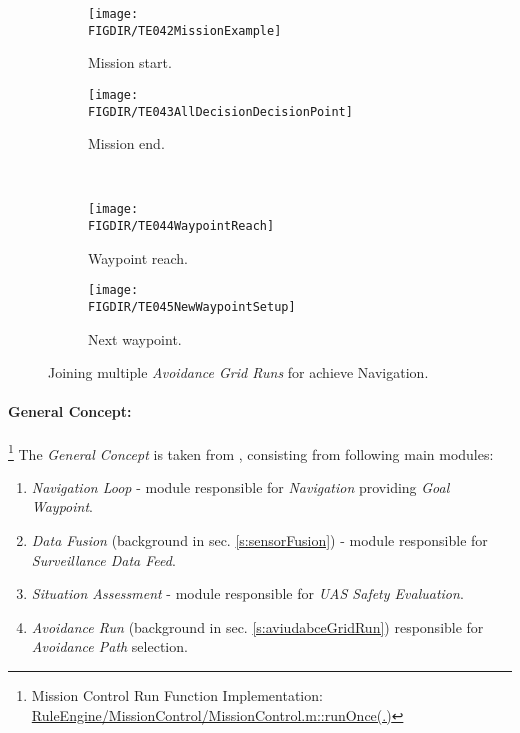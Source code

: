 \begin{figure}[H]
    \centering
    \begin{subfigure}{0.48\textwidth}
        \centering
        \texttt{[image: \\FIGDIR/TE042MissionExample]}
        \caption{Mission start.}
        \label{fig:missionExampleWithOAGR}
    \end{subfigure}
    \begin{subfigure}{0.48\textwidth}
    	\centering
        \texttt{[image: \\FIGDIR/TE043AllDecisionDecisionPoint]} 
        \caption{Mission end.}
        \label{fig:finishedMissionAGR}
    \end{subfigure}
    \\
    \centering
    \begin{subfigure}{0.48\textwidth}
        \centering
        \texttt{[image: \\FIGDIR/TE044WaypointReach]}
        \caption{Waypoint reach.}
        \label{fig:waypointReachAGR}
    \end{subfigure}
    \begin{subfigure}{0.48\textwidth}
    	\centering
        \texttt{[image: \\FIGDIR/TE045NewWaypointSetup]} 
        \caption{Next waypoint.}
        \label{fig:newtWaypointAGR}
    \end{subfigure}
    \caption{Joining multiple \emph{Avoidance Grid Runs} for achieve Navigation.}
    \label{fig:joiningMultipleAGRS}
    
\end{figure}
    

\newpage
\paragraph{General Concept:}\footnote{Mission Control Run Function Implementation: \url{RuleEngine/MissionControl/MissionControl.m::runOnce(.)}} The \emph{General Concept} is taken from  \cite{sabatini2014navigation,Sabatini2014}, consisting from following main modules:
\begin{enumerate}
    \item \emph{Navigation Loop} - module responsible for \emph{Navigation} providing \emph{Goal Waypoint}.
    
    \item \emph{Data Fusion} (background in sec. \ref{s:sensorFusion}) - module responsible for \emph{Surveillance Data Feed}.
    
    \item \emph{Situation Assessment} - module responsible for \emph{UAS Safety Evaluation}. 
    
    \item \emph{Avoidance Run} (background in sec. \ref{s:aviudabceGridRun}) responsible for \emph{Avoidance Path} selection.    
\end{enumerate}


